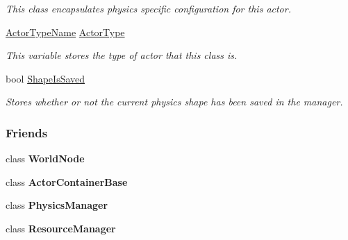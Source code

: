 \begin{DoxyCompactItemize}
\begin{DoxyCompactList}\small\item\em This class encapsulates physics specific configuration for this actor. \item\end{DoxyCompactList}\item 
\hypertarget{classphys_1_1ActorBase_a42baa3657656300eeefe3ed48f526a00}{
\hyperlink{classphys_1_1ActorBase_aff3a7c464e8ce82576073f8f891434b7}{ActorTypeName} \hyperlink{classphys_1_1ActorBase_a42baa3657656300eeefe3ed48f526a00}{ActorType}}
\label{classphys_1_1ActorBase_a42baa3657656300eeefe3ed48f526a00}

\begin{DoxyCompactList}\small\item\em This variable stores the type of actor that this class is. \item\end{DoxyCompactList}\item 
\hypertarget{classphys_1_1ActorBase_a22c0ab01bdc3e1e5c656fb0f201f6929}{
bool \hyperlink{classphys_1_1ActorBase_a22c0ab01bdc3e1e5c656fb0f201f6929}{ShapeIsSaved}}
\label{classphys_1_1ActorBase_a22c0ab01bdc3e1e5c656fb0f201f6929}

\begin{DoxyCompactList}\small\item\em Stores whether or not the current physics shape has been saved in the manager. \item\end{DoxyCompactList}\end{DoxyCompactItemize}
\subsubsection*{Friends}
\begin{DoxyCompactItemize}
\item 
\hypertarget{classphys_1_1ActorBase_a1cacd07efb11226da49a7c80569b18e8}{
class {\bfseries WorldNode}}
\label{classphys_1_1ActorBase_a1cacd07efb11226da49a7c80569b18e8}

\item 
\hypertarget{classphys_1_1ActorBase_a54042fcfa7ab444a50ec79cbe3395356}{
class {\bfseries ActorContainerBase}}
\label{classphys_1_1ActorBase_a54042fcfa7ab444a50ec79cbe3395356}

\item 
\hypertarget{classphys_1_1ActorBase_a139cf05ac01161b7071c8a037c841683}{
class {\bfseries PhysicsManager}}
\label{classphys_1_1ActorBase_a139cf05ac01161b7071c8a037c841683}

\item 
\hypertarget{classphys_1_1ActorBase_a54c1252abc87a78a301e6b6984470408}{
class {\bfseries ResourceManager}}
\label{classphys_1_1ActorBase_a54c1252abc87a78a301e6b6984470408}

\end{DoxyCompactItemize}


